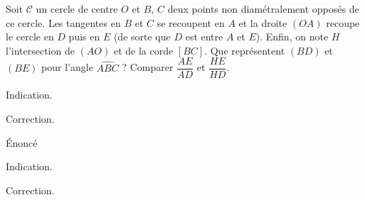 \begin{exo}
Soit $\mathcal C$ un cercle de centre $O$ et $B$, $C$ deux points non diamétralement opposés de ce cercle.
Les tangentes en $B$ et $C$ se recoupent en $A$ et la droite $(OA)$ recoupe le cercle en $D$ puis en  $E$ (de sorte que $D$ est entre $A$ et $E$).
Enfin, on note $H$ l'intersection de $(AO)$ et de la corde $[BC]$.
Que représentent $(BD)$ et $(BE)$ pour l'angle $\widehat{ABC}$ ?%
Comparer $\dfrac{AE}{AD}$ et $\dfrac{HE}{HD}$.
\begin{center}
\end{center}
\begin{hint}
Indication.
\end{hint}
\begin{sol}
Correction.
\end{sol}
\end{exo}



\begin{exo}
Énoncé
\begin{hint}
Indication.
\end{hint}
\begin{sol}
Correction.
\end{sol}
\end{exo}







